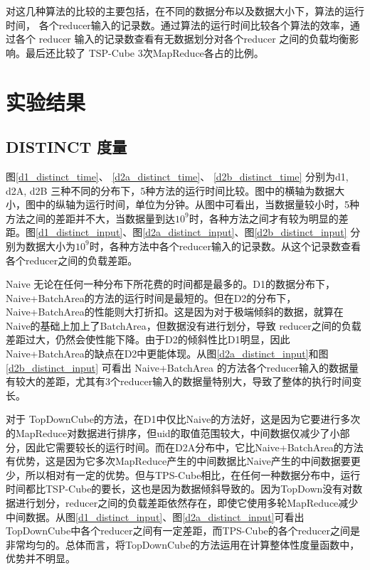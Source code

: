 对这几种算法的比较的主要包括，在不同的数据分布以及数据大小下，算法的运行时间， 各个reducer输入的记录数。通过算法的运行时间比较各个算法的效率，通过各个 reducer 输入的记录数查看有无数据划分对各个reducer 之间的负载均衡影响。最后还比较了 TSP-Cube 3次MapReduce各占的比例。

\section{实验结果}

\subsection{DISTINCT 度量}


图\ref{d1_distinct_time}、 \ref{d2a_distinct_time}、 \ref{d2b_distinct_time} 分别为d1, d2A, d2B 三种不同的分布下，5种方法的运行时间比较。图中的横轴为数据大小，图中的纵轴为运行时间，单位为分钟。从图中可看出，当数据量较小时，5种方法之间的差距并不大，当数据量到达${10}^{9}$时，各种方法之间才有较为明显的差距。图\ref{d1_distinct_input}、图\ref{d2a_distinct_input}、图\ref{d2b_distinct_input} 分别为数据大小为${10}^{9}$时，各种方法中各个reducer输入的记录数。从这个记录数查看各个reducer之间的负载差距。

Naive 无论在任何一种分布下所花费的时间都是最多的。D1的数据分布下，Naive+BatchArea的方法的运行时间是最短的。但在D2的分布下，Naive+BatchArea的性能则大打折扣。这是因为对于极端倾斜的数据，就算在Naive的基础上加上了BatchArea，但数据没有进行划分，导致 reducer之间的负载差距过大，仍然会使性能下降。由于D2的倾斜性比D1明显，因此Naive+BatchArea的缺点在D2中更能体现。从图\ref{d2a_distinct_input}和图\ref{d2b_distinct_input} 可看出 Naive+BatchArea 的方法各个reducer输入的数据量有较大的差距，尤其有3个reducer输入的数据量特别大，导致了整体的执行时间变长。

对于 TopDownCube的方法，在D1中仅比Naive的方法好，这是因为它要进行多次的MapReduce对数据进行排序，但uid的取值范围较大，中间数据仅减少了小部分，因此它需要较长的运行时间。而在D2A分布中，它比Naive+BatchArea的方法有优势，这是因为它多次MapReduce产生的中间数据比Naive产生的中间数据要更少，所以相对有一定的优势。但与TPS-Cube相比，在任何一种数据分布中，运行时间都比TSP-Cube的要长，这也是因为数据倾斜导致的。因为TopDown没有对数据进行划分，reducer之间的负载差距依然存在，即使它使用多轮MapReduce减少中间数据。从图\ref{d1_distinct_input}、图\ref{d2a_distinct_input}可看出TopDownCube中各个reducer之间有一定差距，而TPS-Cube的各个reducer之间是非常均匀的。总体而言，将TopDownCube的方法运用在计算整体性度量函数中，优势并不明显。

